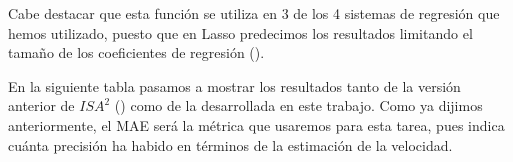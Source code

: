 Cabe destacar que esta función se utiliza en 3 de los 4 sistemas de regresión que hemos utilizado, puesto que en Lasso predecimos los resultados limitando el tamaño de los coeficientes de regresión (\cite{coef_lasso}).

En la siguiente tabla pasamos a mostrar los resultados tanto de la versión anterior de $ISA^{2}$ (\cite{isa2}) como de la desarrollada en este trabajo. Como ya dijimos anteriormente, el \ac{MAE} será la métrica que usaremos para esta tarea, pues indica cuánta precisión ha habido en términos de la estimación de la velocidad.

\begin{table}[H]
\centering
{}
\end{table}
